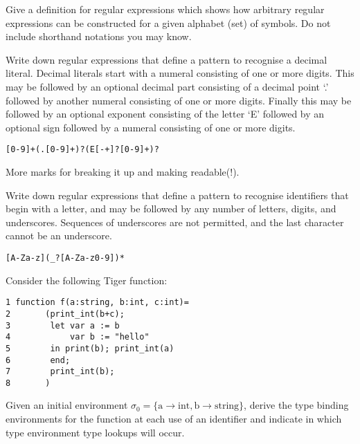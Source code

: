 \documentclass[11pt]{cityexam}
\begin{document}
\begin{questions}


\question

\begin{subquestions}


\subquestion
Give a definition for regular expressions which shows how
arbitrary regular expressions can be constructed for a
given alphabet (set) of symbols. Do not include shorthand
notations you may know.

\subquestion
Write down regular expressions that define a pattern to recognise 
a decimal literal. Decimal literals start with a numeral consisting of
one or more digits. This may be followed by an optional decimal part consisting
of a decimal point `.' followed by another numeral consisting of
one or more digits. Finally this may be followed by an optional exponent
consisting of the letter `E' followed by an optional sign followed 
by a numeral consisting of one or more digits.

\begin{modelanswer}
\begin{verbatim}
[0-9]+(.[0-9]+)?(E[-+]?[0-9]+)?
\end{verbatim}
More marks for breaking it up and making readable(!).
\end{modelanswer}


\subquestion
Write down regular expressions that define a pattern to recognise 
identifiers that begin with a letter, 
and may be followed by any number of
letters, digits, and underscores. 
Sequences of underscores are not permitted,
and the last character cannot be an underscore.

\begin{modelanswer}
\begin{verbatim}
[A-Za-z](_?[A-Za-z0-9])*
\end{verbatim}
\end{modelanswer}



\subquestion
Consider the following Tiger function:
\begin{verbatim}
1 function f(a:string, b:int, c:int)=
2       (print_int(b+c);
3        let var a := b
4            var b := "hello"
5        in print(b); print_int(a) 
6        end;
7        print_int(b);
8       )
\end{verbatim}
Given an initial environment $\sigma_0 = \{\textrm{a} \rightarrow \textrm{int}, \textrm{b} \rightarrow \textrm{string}\}$, 
derive the type binding environments for the function at each
use of an identifier and indicate in which type environment
type lookups will occur.


\end{subquestions}
\end{questions}
\end{document}
